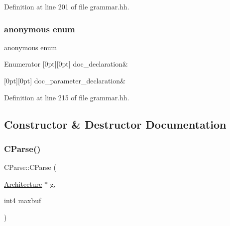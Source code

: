 Definition at line 201 of file grammar.\+hh.

\mbox{\label{class_c_parse_a1947271b9b0eeb3dd3573744e763d593}} 
\subsubsection{\texorpdfstring{anonymous enum}{anonymous enum}}
{\footnotesize\ttfamily anonymous enum}

\begin{DoxyEnumFields}{Enumerator}
[0pt][0pt]{}\mbox{\label{class_c_parse_a1947271b9b0eeb3dd3573744e763d593a30cbc6bd11350e9b87550a3a73c7e4d1}} 
doc\+\_\+declaration&\\
\hline

[0pt][0pt]{}\mbox{\label{class_c_parse_a1947271b9b0eeb3dd3573744e763d593a30204737aae7b64eba795693763a6913}} 
doc\+\_\+parameter\+\_\+declaration&\\
\hline

\end{DoxyEnumFields}


Definition at line 215 of file grammar.\+hh.



\subsection{Constructor \& Destructor Documentation}
\mbox{\label{class_c_parse_ac70e0b56ec51d0e8dcd58b210524c6e3}} 
\subsubsection{\texorpdfstring{CParse()}{CParse()}}
{\footnotesize\ttfamily C\+Parse\+::\+C\+Parse (\begin{DoxyParamCaption}\item[{\mbox{\hyperlink{class_architecture}{Architecture}} $\ast$}]{g,  }\item[{int4}]{maxbuf }\end{DoxyParamCaption})}

